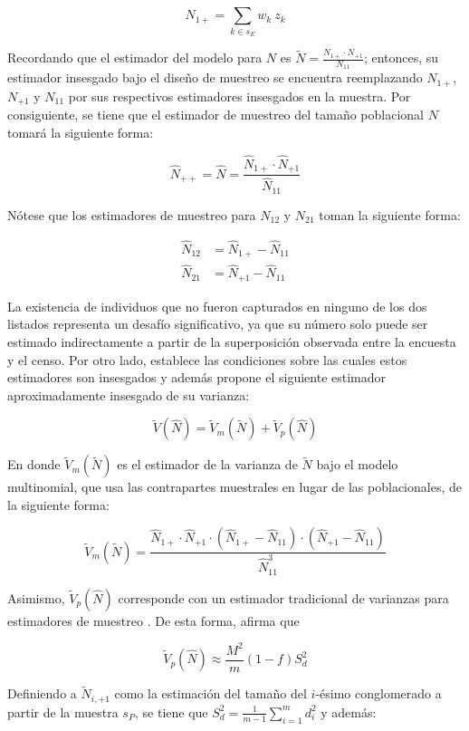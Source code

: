 \documentclass[
  12pt,
]{book}
\begin{document}
\[
\hat{N}_{1+} = \sum_{k \in s_E} w_k \ z_{k}
\]

Recordando que el estimador del modelo para \(N\) es \(\tilde N = \frac{ N_{1+} \cdot N_{+1}}{N_{11}}\); entonces, su estimador insesgado bajo el diseño de muestreo se encuentra reemplazando \(N_{1+}\), \(N_{+1}\) y \(N_{11}\) por sus respectivos estimadores insesgados en la muestra. Por consiguiente, se tiene que el estimador de muestreo del tamaño poblacional \(N\) tomará la siguiente forma:

\[
\hat N_{++} = \hat N = \frac{\hat N_{1+} \cdot \hat{N}_{+1}}{\hat{N}_{11}}
\]

Nótese que los estimadores de muestreo para \({N}_{12}\) y \({N}_{21}\) toman la siguiente forma:

\[
\begin{aligned}
\hat{N}_{12} &= \hat N_{1+} - \hat N_{11} \\
\hat{N}_{21} &= \hat N_{+1} - \hat N_{11}
\end{aligned}
\]

La existencia de individuos que no fueron capturados en ninguno de los dos listados representa un desafío significativo, ya que su número solo puede ser estimado indirectamente a partir de la superposición observada entre la encuesta y el censo. Por otro lado, \citet{wolter1986coverage} establece las condiciones sobre las cuales estos estimadores son insesgados y además propone el siguiente estimador aproximadamente insesgado de su varianza:

\[
\tilde V (\hat N) =  \tilde V_m (\tilde N) + \tilde V_p (\hat N)
\]

En donde \(\tilde V_m (\tilde N)\) es el estimador de la varianza de \(\tilde N\) bajo el modelo multinomial, que usa las contrapartes muestrales en lugar de las poblacionales, de la siguiente forma:

\[
\tilde V_m (\tilde N) = \frac{\hat N_{1+} \cdot \hat N_{+1} \cdot (\hat N_{1+} - \hat N_{11}) \cdot (\hat N_{+1} - \hat N_{11})  }{\hat N_{11}^3}
\]

Asimismo, \(\tilde V_p (\hat N)\) corresponde con un estimador tradicional de varianzas para estimadores de muestreo \citep{CEPAL_2023}. De esta forma, \citet[sección 3.1.]{wolter1986coverage} afirma que

\[
\tilde V_p (\hat N) \approx \frac{M^2}{m}(1-f)S^2_{d}
\]

Definiendo a \(\tilde N_{i, +1}\) como la estimación del tamaño del \(i\)-ésimo conglomerado a partir de la muestra \(s_P\), se tiene que \(S^2_{d} = \frac{1}{m-1}\sum_{i=1}^m d_i^2\) y además:
\end{document}
